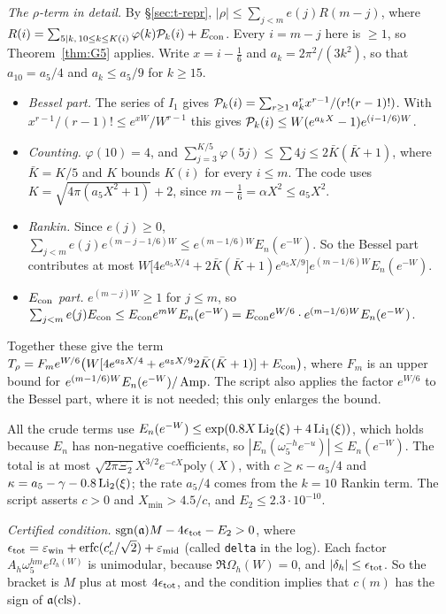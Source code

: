 \emph{The $\rho$-term in detail.} By \S\ref{sec:t-repr}, $|\rho|\le\sum_{j<m}e(j)R(m-j)$, where
$R(i)=\sum_{5\mid k,\,10\le k\le K(i)}\varphi(k)\mathcal P_k(i)+E_{\mathrm{con}}$. Every $i=m-j$ here is $\ge1$, so Theorem~\ref{thm:G5}
applies. Write $x=i-\tfrac16$ and $a_k=2\pi^2/(3k^2)$, so that $a_{10}=a_5/4$ and $a_k\le a_5/9$ for $k\ge15$.
\begin{itemize}
\item \emph{Bessel part.} The series of $I_1$ gives $\mathcal P_k(i)=\sum_{r\ge1}a_k^rx^{r-1}/(r!(r-1)!)$. With
$x^{r-1}/(r-1)!\le e^{xW}/W^{r-1}$ this gives $\mathcal P_k(i)\le W(e^{a_kX}-1)e^{(i-1/6)W}$.
\item \emph{Counting.} $\varphi(10)=4$, and $\sum_{j=3}^{K/5}\varphi(5j)\le\sum4j\le2\bar K(\bar K+1)$, where
$\bar K=K/5$ and $K$ bounds $K(i)$ for every $i\le m$. The code uses $K=\sqrt{4\pi(a_5X^2+1)}+2$, since
$m-\tfrac16=\alpha X^2\le a_5X^2$.
\item \emph{Rankin.} Since $e(j)\ge0$, $\sum_{j<m}e(j)e^{(m-j-1/6)W}\le e^{(m-1/6)W}E_n(e^{-W})$. So the Bessel part
contributes at most $W\big[4e^{a_5X/4}+2\bar K(\bar K+1)e^{a_5X/9}\big]e^{(m-1/6)W}E_n(e^{-W})$.
\item \emph{$E_{\mathrm{con}}$ part.} $e^{(m-j)W}\ge1$ for $j\le m$, so
$\sum_{j<m}e(j)E_{\mathrm{con}}\le E_{\mathrm{con}} e^{mW}E_n(e^{-W})=E_{\mathrm{con}} e^{W/6}\cdot e^{(m-1/6)W}E_n(e^{-W})$.
\end{itemize}
Together these give the term
$T_\rho=F_m e^{W/6}\big(W[4e^{a_5X/4}+e^{a_5X/9}2\bar K(\bar K+1)]+E_{\mathrm{con}}\big)$, where $F_m$ is an upper bound for
$e^{(m-1/6)W}E_n(e^{-W})/\operatorname{Amp}$. The script also applies the factor $e^{W/6}$ to the Bessel part, where it is not needed;
this only enlarges the bound.

All the crude terms use $E_n(e^{-W})\le\exp(0.8X\operatorname{Li}_2(\xi)+4\operatorname{Li}_1(\xi))$, which holds because $E_n$ has non-negative
coefficients, so $|E_n(\omega_5^{-h}e^{-u})|\le E_n(e^{-W})$. The total is at most $\sqrt{2\pi\Xi_2}X^{3/2}e^{-cX}\mathrm{poly}(X)$,
with $c\ge\kappa-a_5/4$ and $\kappa=a_5-\gamma-0.8\operatorname{Li}_2(\xi)$; the rate $a_5/4$ comes from the $k=10$ Rankin term. The
script asserts $c>0$ and $X_{\min}>4.5/c$, and $E_2\le2.3\cdot10^{-10}$.

\emph{Certified condition.} $\operatorname{sgn}(\mathfrak a)M-4\epsilon_{\rm tot}-E_2>0$, where
$\epsilon_{\rm tot}=\varepsilon_{\rm win}+\operatorname{erfc}(c_c'/\sqrt2)+\varepsilon_{\rm mid}$ (called \texttt{delta} in the log).
Each factor $A_h\omega_5^{hm}e^{\Omega_h(W)}$ is unimodular, because $\Re\Omega_h(W)=0$, and $|\delta_h|\le\epsilon_{\rm tot}$.
So the bracket is $M$ plus at most $4\epsilon_{\rm tot}$, and the condition implies that $c(m)$ has the sign of
$\mathfrak a(\mathrm{cls})$.

